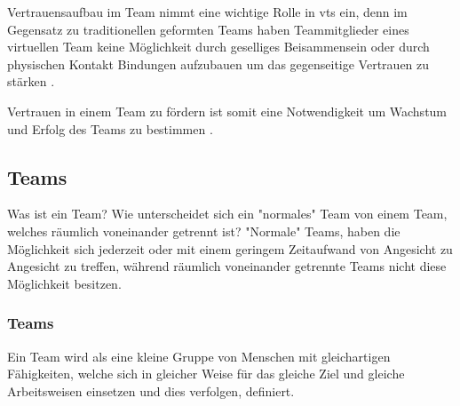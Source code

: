 \documentclass[a4paper,11pt]{article}%
\renewcommand{\\}{\vspace*{0.5\baselineskip} \newline}
\begin{document}
Vertrauensaufbau im Team nimmt eine wichtige Rolle in \ac{vts} ein, denn im Gegensatz zu traditionellen geformten Teams haben Teammitglieder eines virtuellen Team keine Möglichkeit durch geselliges Beisammensein oder durch physischen Kontakt Bindungen aufzubauen um das gegenseitige Vertrauen zu stärken \citep{TrustAndTheVirtualOrganisation}.

Vertrauen in einem Team zu fördern ist somit eine Notwendigkeit um Wachstum und Erfolg des Teams zu bestimmen \citep{glacel1997teamwork}.



\newpage
	\subsection{Teams}		
	\label{Teamwork}
Was ist ein Team? Wie unterscheidet sich ein "normales" Team von einem Team, welches räumlich voneinander getrennt ist? "Normale" Teams, haben die Möglichkeit sich jederzeit oder mit einem geringem Zeitaufwand von Angesicht zu Angesicht zu treffen, während räumlich voneinander getrennte Teams nicht diese Möglichkeit besitzen.

\subsubsection{Teams}
\label{team}
	Ein Team wird als eine kleine Gruppe von Menschen mit gleichartigen Fähigkeiten, welche sich in gleicher Weise für das gleiche Ziel und gleiche Arbeitsweisen einsetzen und dies verfolgen, definiert\citep[p.2]{zenun2007effects}.
	
\end{document}
